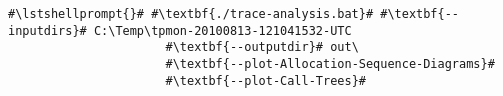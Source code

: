 \begin{lstlisting}[caption=Commands to produce the diagrams under Windows,label=lst:traceAnalysis:sequenceDiagramWin]
#\lstshellprompt{}# #\textbf{./trace-analysis.bat}# #\textbf{--inputdirs}# C:\Temp\tpmon-20100813-121041532-UTC
                      #\textbf{--outputdir}# out\
                      #\textbf{--plot-Allocation-Sequence-Diagrams}#
                      #\textbf{--plot-Call-Trees}#		
\end{lstlisting}
